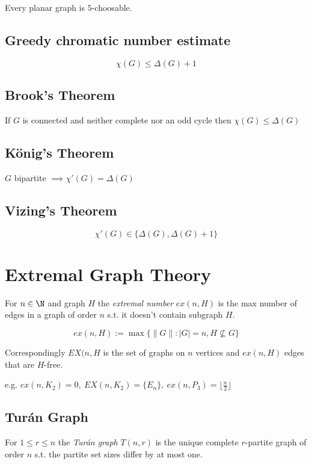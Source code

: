 Every planar graph is $5$-choosable.

\subsection*{Greedy chromatic number estimate}

$$\chi(G) \leq \Delta(G)+1$$

\subsection*{Brook's Theorem}

If $G$ is connected and neither complete nor an odd cycle then $\chi(G) \leq \Delta(G)$

\subsection*{König's Theorem}

$G$ bipartite $\implies \chi'(G) = \Delta(G)$

\subsection*{Vizing's Theorem}

$$\chi'(G) \in \{\Delta(G), \Delta(G)+1\}$$

\section*{Extremal Graph Theory}

For $n \in \N$ and graph $H$ the \emph{extremal number} $ex(n,H)$ is the max number of edges in a graph of order $n$ s.t. it doesn't contain subgraph $H$.

\vspace*{-3mm}
$$ex(n,H):=\max\{\|G\| : |G|=n, H \not\subseteq G\}$$

Correspondingly $EX(n,H$ is the set of graphs on $n$ vertices and $ex(n,H)$ edges that are $H$-free.

\spacing

e.g. $ex(n,K_2) = 0, \ EX(n,K_2) = \{E_n\}, \ ex(n,P_3)=\lfloor\frac{n}{2}\rfloor$

\subsection*{Tur\'{a}n Graph}

For $1 \leq r \leq n$ the \emph{Tur\'{a}n graph} $T(n,r)$ is the unique complete $r$-partite graph of order $n$ s.t. the partite set sizes differ by at most one.

